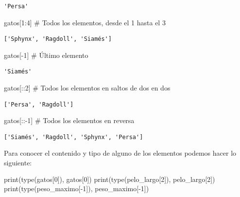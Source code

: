 \documentclass[
  spanish,
  letterpaper,
]{scrbook}
\newenvironment{Shaded}{\begin{snugshade}}{\end{snugshade}}
\newcommand{\BuiltInTok}[1]{\textcolor[rgb]{0.00,0.23,0.31}{#1}}
\newcommand{\CommentTok}[1]{\textcolor[rgb]{0.37,0.37,0.37}{#1}}
\newcommand{\DecValTok}[1]{\textcolor[rgb]{0.68,0.00,0.00}{#1}}
\newcommand{\NormalTok}[1]{\textcolor[rgb]{0.00,0.23,0.31}{#1}}
\newcommand{\OperatorTok}[1]{\textcolor[rgb]{0.37,0.37,0.37}{#1}}
\theoremstyle{definition}
\theoremstyle{remark}
\begin{document}
\begin{verbatim}
'Persa'
\end{verbatim}

\begin{Shaded}
\begin{Highlighting}[]
\NormalTok{gatos[}\DecValTok{1}\NormalTok{:}\DecValTok{4}\NormalTok{] }\CommentTok{\# Todos los elementos, desde el 1 hasta el 3}
\end{Highlighting}
\end{Shaded}

\begin{verbatim}
['Sphynx', 'Ragdoll', 'Siamés']
\end{verbatim}

\begin{Shaded}
\begin{Highlighting}[]
\NormalTok{gatos[}\OperatorTok{{-}}\DecValTok{1}\NormalTok{] }\CommentTok{\# Último elemento}
\end{Highlighting}
\end{Shaded}

\begin{verbatim}
'Siamés'
\end{verbatim}

\begin{Shaded}
\begin{Highlighting}[]
\NormalTok{gatos[::}\DecValTok{2}\NormalTok{] }\CommentTok{\# Todos los elementos en saltos de dos en dos}
\end{Highlighting}
\end{Shaded}

\begin{verbatim}
['Persa', 'Ragdoll']
\end{verbatim}

\begin{Shaded}
\begin{Highlighting}[]
\NormalTok{gatos[::}\OperatorTok{{-}}\DecValTok{1}\NormalTok{] }\CommentTok{\# Todos los elementos en reversa}
\end{Highlighting}
\end{Shaded}

\begin{verbatim}
['Siamés', 'Ragdoll', 'Sphynx', 'Persa']
\end{verbatim}

Para conocer el contenido y tipo de alguno de los elementos podemos
hacer lo siguiente:

\begin{Shaded}
\begin{Highlighting}[]
\BuiltInTok{print}\NormalTok{(}\BuiltInTok{type}\NormalTok{(gatos[}\DecValTok{0}\NormalTok{]), gatos[}\DecValTok{0}\NormalTok{])}
\BuiltInTok{print}\NormalTok{(}\BuiltInTok{type}\NormalTok{(pelo\_largo[}\DecValTok{2}\NormalTok{]), pelo\_largo[}\DecValTok{2}\NormalTok{])}
\BuiltInTok{print}\NormalTok{(}\BuiltInTok{type}\NormalTok{(peso\_maximo[}\OperatorTok{{-}}\DecValTok{1}\NormalTok{]), peso\_maximo[}\OperatorTok{{-}}\DecValTok{1}\NormalTok{])}
\end{Highlighting}
\end{Shaded}
\end{document}
